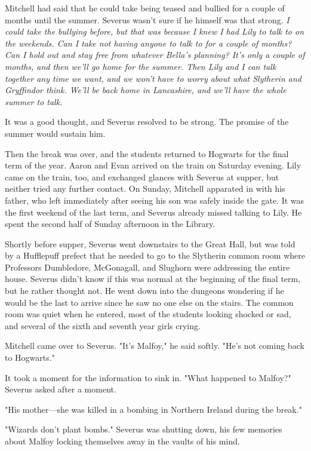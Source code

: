 Mitchell had said that he could take being teased and bullied for a couple of months until the summer. Severus wasn't sure if he himself was that strong. \emph{I could take the bullying before, but that was because I knew I had Lily to talk to on the weekends. Can I take not having anyone to talk to for a couple of months? Can I hold out and stay free from whatever Bella's planning? It's only a couple of months, and then we'll go home for the summer. Then Lily and I can talk together any time we want, and we won't have to worry about what Slytherin and Gryffindor think. We'll be back home in Lancashire, and we'll have the whole summer to talk.}

It was a good thought, and Severus resolved to be strong. The promise of the summer would sustain him.

Then the break was over, and the students returned to Hogwarts for the final term of the year. Aaron and Evan arrived on the train on Saturday evening. Lily came on the train, too, and exchanged glances with Severus at supper, but neither tried any further contact. On Sunday, Mitchell apparated in with his father, who left immediately after seeing his son was safely inside the gate. It was the first weekend of the last term, and Severus already missed talking to Lily. He spent the second half of Sunday afternoon in the Library.

Shortly before supper, Severus went downstairs to the Great Hall, but was told by a Hufflepuff prefect that he needed to go to the Slytherin common room where Professors Dumbledore, McGonagall, and Slughorn were addressing the entire house. Severus didn't know if this was normal at the beginning of the final term, but he rather thought not. He went down into the dungeons wondering if he would be the last to arrive since he saw no one else on the stairs. The common room was quiet when he entered, most of the students looking shocked or sad, and several of the sixth and seventh year girls crying.

Mitchell came over to Severus. "It's Malfoy," he said softly. "He's not coming back to Hogwarts."

It took a moment for the information to sink in. "What happened to Malfoy?" Severus asked after a moment.

"His mother—she was killed in a bombing in Northern Ireland during the break."

"Wizards don't plant bombs." Severus was shutting down, his few memories about Malfoy locking themselves away in the vaults of his mind.

